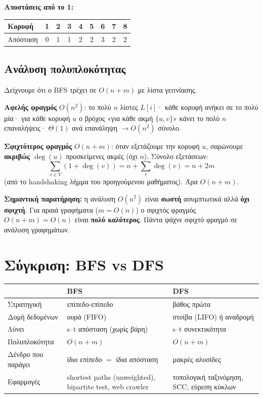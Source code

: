 \documentclass[11pt,a4paper]{article}
\begin{document}
\textbf{Αποστάσεις από το 1:}
\begin{center}
\begin{tabular}{@{}l c c c c c c c c@{}}
\toprule
Κορυφή   & 1 & 2 & 3 & 4 & 5 & 6 & 7 & 8 \\
\midrule
Απόσταση & 0 & 1 & 1 & 2 & 2 & 3 & 2 & 2 \\
\bottomrule
\end{tabular}
\end{center}

\subsection{Ανάλυση πολυπλοκότητας}

Δείχνουμε ότι ο BFS τρέχει σε $O(n + m)$ με λίστα γειτνίασης.

\textbf{Αφελής φραγμός} $O(n^2)$: το πολύ $n$ λίστες $L[i]$· κάθε κορυφή ανήκει
σε το πολύ μία· για κάθε κορυφή $u$ ο βρόχος «για κάθε ακμή $\{u, v\}$» κάνει το
πολύ $n$ επαναλήψεις· $\Theta(1)$ ανά επανάληψη $\to O(n^2)$ σύνολο.

\textbf{Σφιχτότερος φραγμός} $O(n + m)$: όταν εξετάζουμε την κορυφή $u$,
σαρώνουμε \textbf{ακριβώς $\deg(u)$} προσκείμενες ακμές (όχι $n$). Σύνολο
εξετάσεων:
\[
\sum_{v \in V} (1 + \deg(v)) = n + \sum_{v} \deg(v) = n + 2m
\]
(από το handshaking λήμμα του προηγούμενου μαθήματος). Άρα \textbf{$O(n + m)$}.

\begin{keypoint}
\textbf{Σημαντική παρατήρηση:} η ανάλυση $O(n^2)$ είναι \textbf{σωστή}
ασυμπτωτικά αλλά \textbf{όχι σφιχτή}. Για αραιά γραφήματα ($m = O(n)$) ο σφιχτός
φραγμός $O(n+m) = O(n)$ είναι \textbf{πολύ καλύτερος}. Πάντα ψάχνε σφιχτό φραγμό
σε ανάλυση γραφημάτων.
\end{keypoint}

\section{Σύγκριση: BFS vs DFS}

\begin{center}
\begin{tabular}{@{}l p{4.7cm} p{4.7cm}@{}}
\toprule
 & \textbf{BFS} & \textbf{DFS} \\
\midrule
Στρατηγική        & επίπεδο-επίπεδο & βάθος πρώτα \\
Δομή δεδομένων    & ουρά (FIFO)     & στοίβα (LIFO) ή αναδρομή \\
Λύνει             & s--t απόσταση (χωρίς βάρη) & s--t συνεκτικότητα \\
Πολυπλοκότητα     & $O(n + m)$      & $O(n + m)$ \\
Δένδρο που παράγει& ίδιο επίπεδο $=$ ίδια απόσταση & μακρές αλυσίδες \\
Εφαρμογές         & shortest paths (unweighted), bipartite test, web crawler & τοπολογική ταξινόμηση, SCC, εύρεση κύκλων \\
\bottomrule
\end{tabular}
\end{center}
\end{document}
